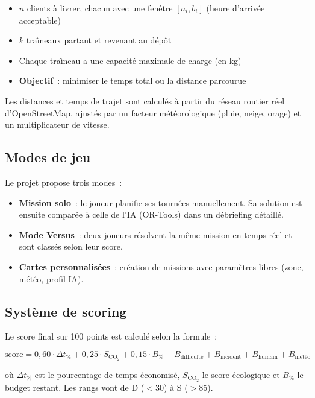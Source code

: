 \documentclass[a4paper, 12pt, twoside]{article}
\begin{document}
\begin{itemize}
  \item $n$ clients \`{a} livrer, chacun avec une fen\^{e}tre $[a_i, b_i]$ (heure d'arriv\'{e}e acceptable)
  \item $k$ tra\^{\i}neaux partant et revenant au d\'{e}p\^{o}t
  \item Chaque tra\^{\i}neau a une capacit\'{e} maximale de charge (en kg)
  \item \textbf{Objectif}~: minimiser le temps total ou la distance parcourue
\end{itemize}

Les distances et temps de trajet sont calcul\'{e}s \`{a} partir du r\'{e}seau routier r\'{e}el d'OpenStreetMap, ajust\'{e}s par un facteur m\'{e}t\'{e}orologique (pluie, neige, orage) et un multiplicateur de vitesse.

\subsection{Modes de jeu}

Le projet propose trois modes~:

\begin{itemize}
  \item \textbf{Mission solo}~: le joueur planifie ses tourn\'{e}es manuellement. Sa solution est ensuite compar\'{e}e \`{a} celle de l'IA (OR-Tools) dans un d\'{e}briefing d\'{e}taill\'{e}.
  \item \textbf{Mode Versus}~: deux joueurs r\'{e}solvent la m\^{e}me mission en temps r\'{e}el et sont class\'{e}s selon leur score.
  \item \textbf{Cartes personnalis\'{e}es}~: cr\'{e}ation de missions avec param\`{e}tres libres (zone, m\'{e}t\'{e}o, profil IA).
\end{itemize}

\subsection{Syst\`{e}me de scoring}

Le score final sur 100 points est calcul\'{e} selon la formule~:

\[
\text{score} = 0{,}60 \cdot \Delta t_{\%} + 0{,}25 \cdot S_{\text{CO}_2} + 0{,}15 \cdot B_{\%}
+ B_{\text{difficulté}} + B_{\text{incident}} + B_{\text{humain}} + B_{\text{météo}}
\]

o\`{u} $\Delta t_{\%}$ est le pourcentage de temps \'{e}conomis\'{e}, $S_{\text{CO}_2}$ le score \'{e}cologique et $B_{\%}$ le budget restant. Les rangs vont de D ($<$30) \`{a} S ($>$85).
\end{document}
